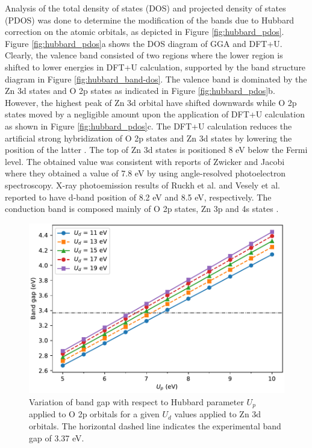 Analysis of the total density of states (DOS) and projected density of states (PDOS) was done to determine the modification of the bands due to  Hubbard correction on the atomic orbitals, as depicted in Figure \ref{fig:hubbard_pdos}. Figure \ref{fig:hubbard_pdos}a shows the DOS diagram of GGA and DFT+U. Clearly, the valence band consisted of two regions where the lower region is shifted to lower energies in DFT+U calculation, supported  by the band structure diagram in Figure \ref{fig:hubbard_band-dos}. The valence band is dominated by the Zn 3d states and O 2p states as indicated in Figure  \ref{fig:hubbard_pdos}b. However, the highest peak of Zn 3d orbital have shifted downwards while O 2p states moved by a negligible amount upon the application of DFT+U calculation as shown in Figure \ref{fig:hubbard_pdos}c. The DFT+U calculation reduces the artificial strong hybridization of O 2p states and Zn 3d states by lowering the position of the latter \citep{Goh2017}. The top of Zn 3d states is positioned 8 eV below the Fermi level. The obtained value was consistent with reports of Zwicker and Jacobi \citep{Zwicker1985} where they obtained a value of 7.8 eV by using angle-resolved photoelectron spectroscopy. X-ray photoemission results of Ruckh et al. \citep{Ruckh1994} and Vesely et al. \citep{Vesely1972} reported to have d-band position of 8.2 eV and 8.5 eV, respectively. The conduction band is composed mainly of O 2p states, Zn 3p and 4s states \citep{Harun2020}.



\begin{figure}[htbp!]
	\centering
	\includegraphics[width=0.7\linewidth]{"images/rnd/hubbard_val"}
	\caption[Variation of band gap with respect to Hubbard parameter $U_p$ applied to O 2p orbitals for a given $U_d$ applied to Zn 3d orbitals. ]{Variation of band gap with respect to Hubbard parameter $U_p$ applied to O 2p orbitals for a given $U_d$ values applied to Zn 3d orbitals. The horizontal dashed line indicates the experimental band gap of 3.37 eV.}
	\label{fig:hubbard_val}
\end{figure}

